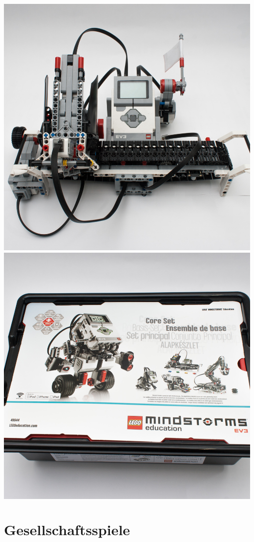 \documentclass[a4paper]{article}
\newcommand{\infobox}[3] %
        {\par
                \begin{tabular}{| c | c | c| }
                \hline
                Anzahl: #1 & Ausleihgebühr: \EUR{#2}   \\
                \hline
                \end{tabular} \\
        }
\begin{document}
\includegraphics[width=.3\textwidth]{Mindstorms EV3 Edu Core.jpg}\includegraphics[width=.3\textwidth]{Mindstorms EV3 Edu Core-2.jpg}








\section{Gesellschaftsspiele}
\end{document}
